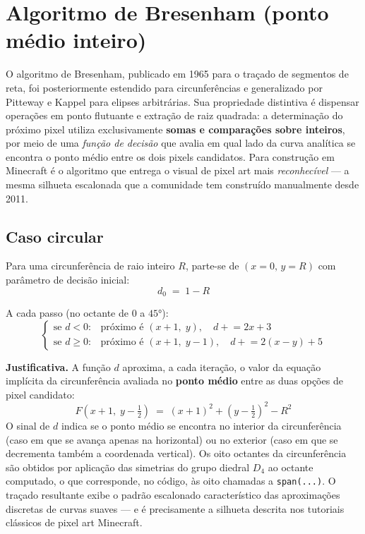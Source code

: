 \documentclass[12pt,a4paper]{scrartcl}
\newcommand{\code}[1]{\texttt{\small #1}}
\newcommand{\acc}[1]{\textcolor{accent}{\textbf{#1}}}
\begin{document}
\section{Algoritmo de Bresenham (ponto médio inteiro)}

O algoritmo de Bresenham, publicado em 1965 para o traçado de segmentos de reta, foi posteriormente estendido para circunferências e generalizado por Pitteway e Kappel para elipses arbitrárias. Sua propriedade distintiva é dispensar operações em ponto flutuante e extração de raiz quadrada: a determinação do próximo pixel utiliza exclusivamente \acc{somas e comparações sobre inteiros}, por meio de uma \emph{função de decisão} que avalia em qual lado da curva analítica se encontra o ponto médio entre os dois pixels candidatos. Para construção em Minecraft é o algoritmo que entrega o visual de pixel art mais \emph{reconhecível} --- a mesma silhueta escalonada que a comunidade tem construído manualmente desde 2011.

\subsection{Caso circular}

Para uma circunferência de raio inteiro $R$, parte-se de $(x{=}0,\,y{=}R)$ com parâmetro de decisão inicial:
\[
d_0 \;=\; 1 - R
\]

A cada passo (no octante de $0$ a $45°$):
\[
\begin{cases}
\text{se } d < 0: & \text{próximo é } (x{+}1,\;y), \quad d \mathrel{+}= 2x+3 \\[2pt]
\text{se } d \geq 0: & \text{próximo é } (x{+}1,\;y{-}1), \quad d \mathrel{+}= 2(x-y)+5
\end{cases}
\]

\textbf{Justificativa.} A função $d$ aproxima, a cada iteração, o valor da equação implícita da circunferência avaliada no \acc{ponto médio} entre as duas opções de pixel candidato:
\[
F\!\left(x+1,\;y-\tfrac{1}{2}\right) \;=\; (x+1)^2 + \left(y-\tfrac{1}{2}\right)^{\!2} - R^2
\]
O sinal de $d$ indica se o ponto médio se encontra no interior da circunferência (caso em que se avança apenas na horizontal) ou no exterior (caso em que se decrementa também a coordenada vertical). Os oito octantes da circunferência são obtidos por aplicação das simetrias do grupo diedral $D_4$ ao octante computado, o que corresponde, no código, às oito chamadas a \code{span(...)}. O traçado resultante exibe o padrão escalonado característico das aproximações discretas de curvas suaves --- e é precisamente a silhueta descrita nos tutoriais clássicos de pixel art Minecraft.
\end{document}
